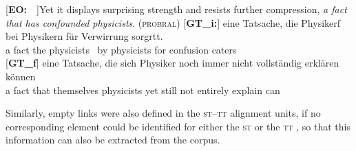 \documentclass[output=paper]{LSP/langsci}
\begin{document}
\ea \label{ex:1:3}
\begin{xlist}
\exi{}[\textbf{EO:}~~]{Yet it displays surprising strength and resists further compression, \emph{a fact that has confounded physicists}. (\textsc{probral})}
\exi{}[\textbf{GT\_i:}]{
\gll \raute\stern\stern{} eine{\raute} Tatsache,{\raute} die{\raute} Physikerf\raute\stern\pfeil\pfeil\raute{\color{red}[{\stern}11.968]}\pfeil\pfeil\pfeil\pfeil\pfeil\pfeil\pfeil\pfeil\pfeil{} bei\raute{} Physikern\raute{} für\raute{} Verwirrung\raute{} sorgrt\pfeil\pfeil{}t.\\
 {} a fact the physicists~ by physicists for confusion caters\\
}
\exi{}[\textbf{GT\_f}]{
\gll  eine Tatsache, die sich Physiker noch immer nicht vollständig erklären können\\
  a fact that themselves physicists yet still not entirely explain can\\
}
\end{xlist}
\z

\newpage
Similarly, empty links were also defined in the \textsc{st}--\textsc{tt} alignment units, if no corresponding element could be identified for either the \textsc{st} or the \textsc{tt} \citep{Culo2012}, so that this information can also be extracted from the corpus.    
\end{document}
